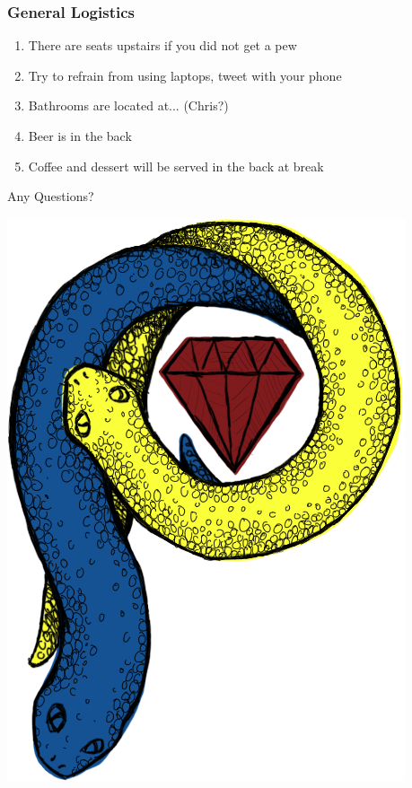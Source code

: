 \documentclass[xcolor=dvipsnames,red]{beamer}
\begin{document}
\begin{frame}
\frametitle{General Logistics}
\begin{enumerate}
\item There are seats upstairs if you did not get a pew
\item Try to refrain from using laptops, tweet with your phone
\item Bathrooms are located at... (Chris?)
\item Beer is in the back
\item Coffee and dessert will be served in the back at break
\end{enumerate}

Any Questions?
\end{frame}

\begin{frame}[plain]
\titlepage
\vspace{-2 cm}
\begin{center}
\includegraphics[width=.4\textwidth]{imgs/rs-logo-2.png}
\end{center}
\end{frame}
\end{document}
